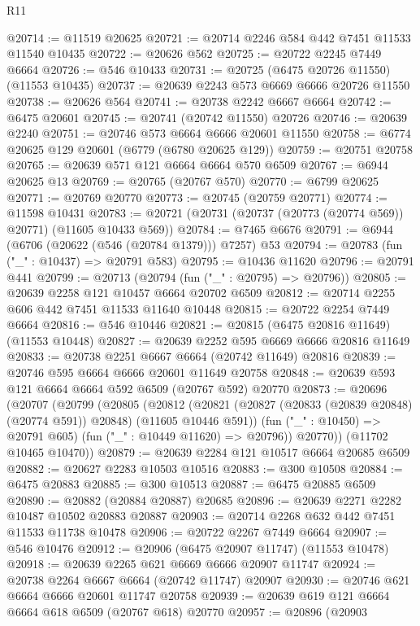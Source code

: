 \begin{lexlean}{R11}
\begin{coremodule}
{{{{{{{{{{{{{{{{{{{{{{{{{{{{{{{{{{{{{{{{{{{{{{{{{{{{{{{{{{{{{{{{{{{{{{{{{{{{{{{{{{@20714 := @11519 @20625
@20721 := @20714 @2246 @584 @442 @7451 @11533 @11540 @10435
@20722 := @20626 @562
@20725 := @20722 @2245 @7449 @6664
@20726 := @546 @10433
@20731 := @20725 (@6475 @20726 @11550) (@11553 @10435)
@20737 := @20639 @2243 @573 @6669 @6666 @20726 @11550
@20738 := @20626 @564
@20741 := @20738 @2242 @6667 @6664
@20742 := @6475 @20601
@20745 := @20741 (@20742 @11550) @20726
@20746 := @20639 @2240
@20751 := @20746 @573 @6664 @6666 @20601 @11550
@20758 := @6774 @20625 @129 @20601 (@6779 (@6780 @20625 @129))
@20759 := @20751 @20758
@20765 := @20639 @571 @121 @6664 @6664 @570 @6509
@20767 := @6944 @20625 @13
@20769 := @20765 (@20767 @570)
@20770 := @6799 @20625
@20771 := @20769 @20770
@20773 := @20745 (@20759 @20771)
@20774 := @11598 @10431
@20783 := @20721 (@20731 (@20737 (@20773 (@20774 @569)) @20771) (@11605 @10433 @569))
@20784 := @7465 @6676
@20791 := @6944 (@6706 (@20622 (@546 (@20784 @1379))) @7257) @53
@20794 := @20783 (fun ("_" : @10437) => @20791 @583)
@20795 := @10436 @11620
@20796 := @20791 @441
@20799 := @20713 (@20794 (fun ("_" : @20795) => @20796))
@20805 := @20639 @2258 @121 @10457 @6664 @20702 @6509
@20812 := @20714 @2255 @606 @442 @7451 @11533 @11640 @10448
@20815 := @20722 @2254 @7449 @6664
@20816 := @546 @10446
@20821 := @20815 (@6475 @20816 @11649) (@11553 @10448)
@20827 := @20639 @2252 @595 @6669 @6666 @20816 @11649
@20833 := @20738 @2251 @6667 @6664 (@20742 @11649) @20816
@20839 := @20746 @595 @6664 @6666 @20601 @11649 @20758
@20848 := @20639 @593 @121 @6664 @6664 @592 @6509 (@20767 @592) @20770
@20873 := @20696
    (@20707
      (@20799
        (@20805
          (@20812
            (@20821 (@20827 (@20833 (@20839 @20848) (@20774 @591)) @20848) (@11605 @10446 @591))
            (fun ("_" : @10450) => @20791 @605)
            (fun ("_" : @10449 @11620) => @20796))
          @20770))
      (@11702 @10465 @10470))
@20879 := @20639 @2284 @121 @10517 @6664 @20685 @6509
@20882 := @20627 @2283 @10503 @10516
@20883 := @300 @10508
@20884 := @6475 @20883
@20885 := @300 @10513
@20887 := @6475 @20885 @6509
@20890 := @20882 (@20884 @20887) @20685
@20896 := @20639 @2271 @2282 @10487 @10502 @20883 @20887
@20903 := @20714 @2268 @632 @442 @7451 @11533 @11738 @10478
@20906 := @20722 @2267 @7449 @6664
@20907 := @546 @10476
@20912 := @20906 (@6475 @20907 @11747) (@11553 @10478)
@20918 := @20639 @2265 @621 @6669 @6666 @20907 @11747
@20924 := @20738 @2264 @6667 @6664 (@20742 @11747) @20907
@20930 := @20746 @621 @6664 @6666 @20601 @11747 @20758
@20939 := @20639 @619 @121 @6664 @6664 @618 @6509 (@20767 @618) @20770
@20957 := @20896
    (@20903
}}}}}}}}}}}}}}}}}}}}}}}}}}}}}}}}}}}}}}}}}}}}}}}}}}}}}}}}}}}}}}}}}}}}}}}}}}}}}}}}}}
\end{coremodule}
\end{lexlean}
